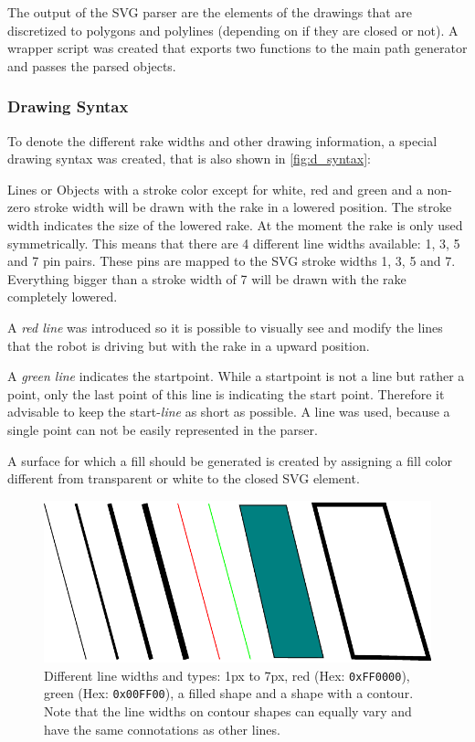 The output of the SVG parser are the elements of the drawings that are discretized to polygons and polylines (depending on if they are closed or not). A wrapper script was created that exports two functions to the main path generator and passes the parsed objects.	

\subsubsection{Drawing Syntax} 

To denote the different rake widths and other drawing information, a special drawing syntax was created, that is also shown in \autoref{fig:d_syntax}:

Lines or Objects with a stroke color except for white, red and green and a non-zero stroke width will be drawn with the rake in a lowered position. The stroke width indicates the size of the lowered rake. At the moment the rake is only used symmetrically. This means that there are 4 different line widths available: 1, 3, 5 and 7 pin pairs. These pins are mapped to the SVG stroke widths 1, 3, 5 and 7. Everything bigger than a stroke width of 7 will be drawn with the rake completely lowered.

A \textit{red line} was introduced so it is possible to visually see and modify the lines that the robot is driving but with the rake in a upward position.

A \textit{green line} indicates the startpoint. While a startpoint is not a line but rather a point, only the last point of this line is indicating the start point.  Therefore it advisable to keep the start-\textit{line} as short as possible. A line was used, because a single point can not be easily represented in the parser.

A surface for which a fill should be generated is created by assigning a fill color different from transparent or white to the closed SVG element.

\begin{figure}
\centering
    		\includegraphics[width=\textwidth]{images/implementation/lines_terminology.pdf}
		\caption{Different line widths and types: 1px to 7px, red (Hex: \texttt{0xFF0000}), green (Hex: \texttt{0x00FF00}), a filled shape and a shape with a contour. Note that the line widths on contour shapes can equally vary and have the same connotations as other lines.}\label{fig:d_syntax}
\end{figure}

